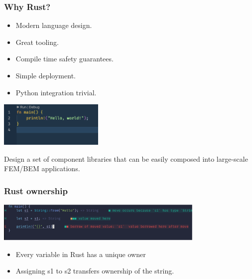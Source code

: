 \documentclass[dvipsnames,10pt]{beamer}
\begin{document}
\begin{frame}
\frametitle{Why Rust?}
\begin{minipage}{5cm}
\begin{itemize}
\item Modern language design.
\item Great tooling.
\item Compile time safety guarantees.
\item Simple deployment.
\item Python integration trivial.
\end{itemize}
\end{minipage}
\begin{minipage}{5cm}
\includegraphics[width=5cm]{../figs/rust_hello}
\end{minipage}

\vspace{2\baselineskip}

\begin{tcolorbox}
Design a set of component libraries that can be easily composed into large-scale FEM/BEM applications.
\end{tcolorbox}

\end{frame}

\begin{frame}
\frametitle{Rust ownership}

\begin{center}
\includegraphics[width=10cm]{../figs/rust_ownership}
\end{center}

\begin{itemize}
\item Every variable in Rust has a unique owner
\item Assigning s1 to s2 transfers ownership of the string.
\end{itemize}


\end{frame}
\end{document}
